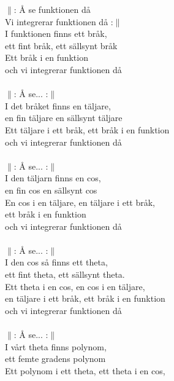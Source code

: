 \documentclass[a6paper, 10pt, twoside]{article}
\begin{document}
\begin{center}
\end{center}
\begin{lyrics}
$\|$: Å se funktionen då \\
Vi integrerar funktionen då :$\|$ \\
I funktionen finns ett bråk, \\
ett fint bråk, ett sällsynt bråk\\ 
Ett bråk i en funktion \\
och vi integrerar funktionen då \\
\vspace{7pt}\\
$\|$: Å se... :$\|$ \\
I det bråket finns en täljare, \\
en fin täljare en sällsynt täljare\\
Ett täljare i ett bråk, ett bråk i en funktion \\
och vi integrerar funktionen då \\
\vspace{7pt}\\
$\|$: Å se... :$\|$ \\
I den täljarn finns en cos, \\ 
en fin cos en sällsynt cos \\
En cos i en täljare, en täljare i ett bråk, \\
ett bråk i en funktion \\
och vi integrerar funktionen då \\
\vspace{7pt}\\
$\|$: Å se... :$\|$ \\
I den cos så finns ett theta, \\
ett fint theta, ett sällsynt theta. \\
Ett theta i en cos, en cos i en täljare, \\
en täljare i ett bråk, ett bråk i en funktion \\
och vi integrerar funktionen då\\
\vspace{7pt}\\
$\|$: Å se... :$\|$ \\
I vårt theta finns polynom, \\
ett femte gradens polynom \\
Ett polynom i ett theta, ett theta i en cos, \\

\end{lyrics}
\end{document}
